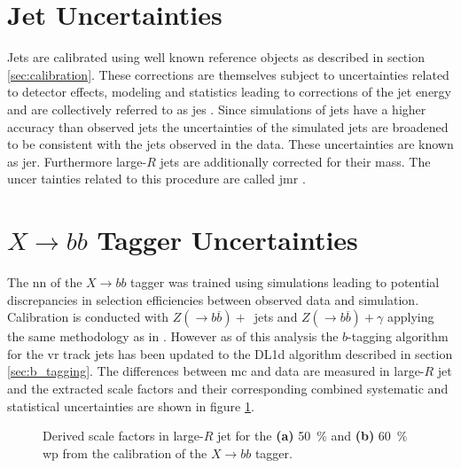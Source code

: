 \section{Jet Uncertainties}
Jets are calibrated using well known reference objects as described in section \ref{sec:calibration}. These corrections are themselves subject to uncertainties related to detector effects, modeling and statistics leading to corrections of the jet energy and are collectively referred to as \ac{jes} \citep{atlas2021jet,Aaboud:2019aa}. Since simulations of jets have a higher accuracy than observed jets the uncertainties of the simulated jets are broadened to be consistent with the jets observed in the data. These uncertainties are known as \ac{jer}. Furthermore large-$R$ jets are additionally corrected for their mass. The uncer tainties related to this procedure are called \ac{jmr} \citep{ATLAS-CONF-2020-022}.

\section{$X\rightarrow bb$ Tagger Uncertainties}
The \ac{nn} of the $X\rightarrow bb$ tagger was trained using simulations leading to potential discrepancies in selection efficiencies between observed data and simulation. Calibration is conducted with $Z(\rightarrow b\overline{b})+$~jets and $Z(\rightarrow b\overline{b})+\gamma$ applying the same methodology as in \citep{ATL-PHYS-PUB-2021-035}. However as of this analysis the $b$-tagging algorithm for the \ac{vr} track jets has been updated to the DL1d algorithm described in section \ref{sec:b_tagging}. The differences between \ac{mc} and data are measured in large-$R$ jet \pt and the extracted scale factors and their corresponding combined systematic and statistical uncertainties are shown in figure \ref{fig:xbb_sf}.
\begin{figure}
    \centering
    \caption[]{Derived scale factors in large-$R$ jet \pt for the \textbf{(a)} \qty[]{50}{\percent} and \textbf{(b)} \qty[]{60}{\percent} \ac{wp} from the calibration of the $X\rightarrow bb$ tagger.}
    \label{fig:xbb_sf}
\end{figure}

